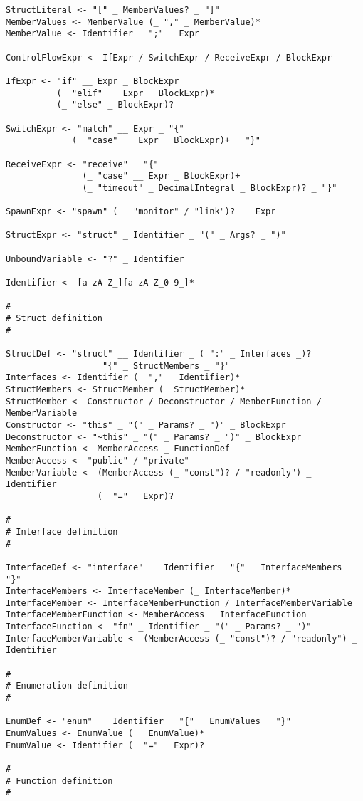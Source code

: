 \begin{verbatim}
StructLiteral <- "[" _ MemberValues? _ "]"
MemberValues <- MemberValue (_ "," _ MemberValue)*
MemberValue <- Identifier _ ";" _ Expr

ControlFlowExpr <- IfExpr / SwitchExpr / ReceiveExpr / BlockExpr

IfExpr <- "if" __ Expr _ BlockExpr
          (_ "elif" __ Expr _ BlockExpr)*
          (_ "else" _ BlockExpr)?

SwitchExpr <- "match" __ Expr _ "{"
             (_ "case" __ Expr _ BlockExpr)+ _ "}"

ReceiveExpr <- "receive" _ "{"
               (_ "case" __ Expr _ BlockExpr)+
               (_ "timeout" _ DecimalIntegral _ BlockExpr)? _ "}"

SpawnExpr <- "spawn" (__ "monitor" / "link")? __ Expr

StructExpr <- "struct" _ Identifier _ "(" _ Args? _ ")"

UnboundVariable <- "?" _ Identifier

Identifier <- [a-zA-Z_][a-zA-Z_0-9_]*

#
# Struct definition
#

StructDef <- "struct" __ Identifier _ ( ":" _ Interfaces _)?
                   "{" _ StructMembers _ "}"
Interfaces <- Identifier (_ "," _ Identifier)*
StructMembers <- StructMember (_ StructMember)*
StructMember <- Constructor / Deconstructor / MemberFunction / MemberVariable
Constructor <- "this" _ "(" _ Params? _ ")" _ BlockExpr
Deconstructor <- "~this" _ "(" _ Params? _ ")" _ BlockExpr
MemberFunction <- MemberAccess _ FunctionDef
MemberAccess <- "public" / "private"
MemberVariable <- (MemberAccess (_ "const")? / "readonly") _ Identifier
                  (_ "=" _ Expr)?

#
# Interface definition
#

InterfaceDef <- "interface" __ Identifier _ "{" _ InterfaceMembers _ "}"
InterfaceMembers <- InterfaceMember (_ InterfaceMember)*
InterfaceMember <- InterfaceMemberFunction / InterfaceMemberVariable
InterfaceMemberFunction <- MemberAccess _ InterfaceFunction
InterfaceFunction <- "fn" _ Identifier _ "(" _ Params? _ ")"
InterfaceMemberVariable <- (MemberAccess (_ "const")? / "readonly") _ Identifier

#
# Enumeration definition
#

EnumDef <- "enum" __ Identifier _ "{" _ EnumValues _ "}"
EnumValues <- EnumValue (__ EnumValue)*
EnumValue <- Identifier (_ "=" _ Expr)?

#
# Function definition
#


\end{verbatim}
